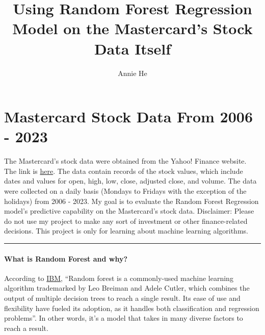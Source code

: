 \documentclass[11pt]{article}
\title{Using Random Forest Regression Model on the Mastercard’s Stock Data Itself}
\author{Annie He}
\begin{document}
    
    \maketitle
    
    

    
    \hypertarget{mastercard-stock-data-from-2006---2023}{%
\section{Mastercard Stock Data From 2006 -
2023}\label{mastercard-stock-data-from-2006---2023}}

The Mastercard's stock data were obtained from the Yahoo! Finance
website. The link is
\href{https://finance.yahoo.com/quote/MA/history?period1=1148515200\&period2=1680652800\&interval=1d\&filter=history\&frequency=1d\&includeAdjustedClose=true}{here}.
The data contain records of the stock values, which include dates and
values for open, high, low, close, adjusted close, and volume. The data
were collected on a daily basis (Mondays to Fridays with the exception
of the holidays) from 2006 - 2023. My goal is to evaluate the Random
Forest Regression model's predictive capability on the Mastercard's
stock data. Disclaimer: Please do not use my project to make any sort of
investment or other finance-related decisions. This project is only for
learning about machine learning algorithms.

\begin{center}\rule{0.5\linewidth}{0.5pt}\end{center}

\hypertarget{what-is-random-forest-and-why}{%
\paragraph{What is Random Forest and
why?}\label{what-is-random-forest-and-why}}

According to \href{https://www.ibm.com/topics/random-forest}{IBM},
``Random forest is a commonly-used machine learning algorithm
trademarked by Leo Breiman and Adele Cutler, which combines the output
of multiple decision trees to reach a single result. Its ease of use and
flexibility have fueled its adoption, as it handles both classification
and regression problems''. In other words, it's a model that takes in
many diverse factors to reach a result.
\end{document}

